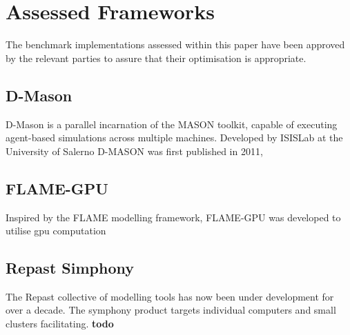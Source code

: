 \section{Assessed Frameworks\label{sec:assessed-frameworks}}
  The benchmark implementations assessed within this paper have been approved by the relevant parties to assure that their optimisation is appropriate.
  \subsection{D-Mason}
    D-Mason is a parallel incarnation of the MASON toolkit, capable of executing agent-based simulations across multiple machines. Developed by ISISLab at the University of Salerno D-MASON was first published in 2011,
  \subsection{FLAME-GPU}
    Inspired by the FLAME modelling framework, FLAME-GPU was developed to utilise \gls{gpu} computation
  \subsection{Repast Simphony}
    The Repast collective of modelling tools has now been under development for over a decade. The symphony product targets individual computers and small clusters facilitating.\cite{repast2013}
  \textbf{todo}